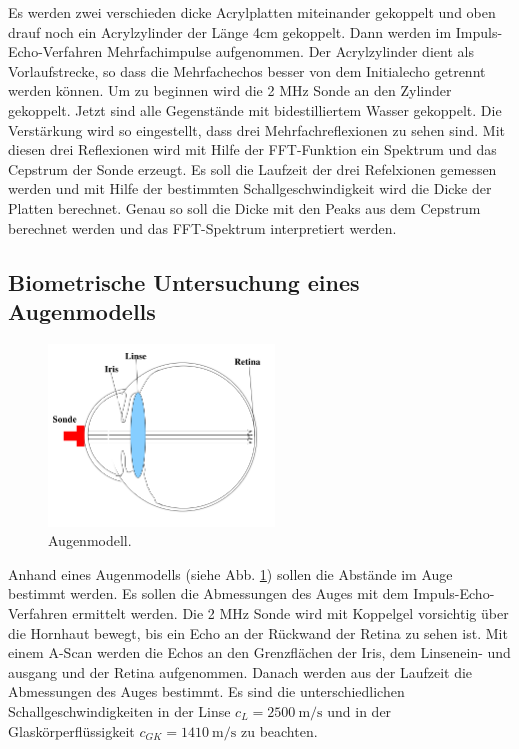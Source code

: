 Es werden zwei verschieden dicke Acrylplatten miteinander gekoppelt und oben drauf noch ein Acrylzylinder der Länge 4cm gekoppelt.
Dann werden im Impuls-Echo-Verfahren Mehrfachimpulse aufgenommen.
Der Acrylzylinder dient als Vorlaufstrecke, so dass die Mehrfachechos besser von dem Initialecho getrennt werden können.
Um zu beginnen wird die 2 MHz Sonde an den Zylinder gekoppelt.
Jetzt sind alle Gegenstände mit bidestilliertem Wasser gekoppelt.
Die Verstärkung wird so eingestellt, dass drei Mehrfachreflexionen zu sehen sind.
Mit diesen drei Reflexionen wird mit Hilfe der FFT-Funktion ein Spektrum und das Cepstrum der Sonde erzeugt.
Es soll die Laufzeit der drei Refelxionen gemessen werden und mit Hilfe der bestimmten Schallgeschwindigkeit wird die Dicke der Platten berechnet.
Genau so soll die Dicke mit den Peaks aus dem Cepstrum berechnet werden und das FFT-Spektrum interpretiert werden.

\subsection{Biometrische Untersuchung eines Augenmodells}
\label{sec:auge}

\begin{figure}
    \centering
    \includegraphics[width=6cm]{data/abb1.png}
    \caption{Augenmodell. \cite{US1}}
    \label{fig:modell}
  \end{figure}
  \FloatBarrier

Anhand eines Augenmodells (siehe Abb. \ref{fig:modell}) sollen die Abstände im Auge bestimmt werden.
Es sollen die Abmessungen des Auges mit dem Impuls-Echo-Verfahren ermittelt werden.
Die 2 MHz Sonde wird mit Koppelgel vorsichtig über die Hornhaut bewegt, bis ein Echo an der Rückwand der Retina zu sehen ist.
Mit einem A-Scan werden die Echos an den Grenzflächen der Iris, dem Linsenein- und ausgang und der Retina aufgenommen.
Danach werden aus der Laufzeit die Abmessungen des Auges bestimmt.
Es sind die unterschiedlichen Schallgeschwindigkeiten in der Linse $c_L = \SI{2500}{\meter\per\second}$ und in der Glaskörperflüssigkeit $c_{GK} = \SI{1410}{\meter\per\second}$ zu beachten.
